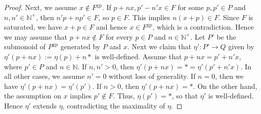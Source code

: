 \documentclass[10pt,a4paper]{amsart}
\newcommand{\N}{\mathbb{N}}
\newcommand{\gp}{\mathrm{gp}}
\begin{document}
\begin{proof}
Next, we assume $x\notin F^\gp$.
If $p+nx,p'-n'x\in F$ for some $p,p'\in P$ and $n,n'\in \N^+$,
then $n'p+np'\in F$,
so $p\in F$.
This implies $n(x+p)\in F$.
Since $F$ is saturated,
we have $x+p\in F$ and hence $x\in F^\gp$,
which is a contradiction.
Hence we may assume that $p+nx\notin F$ for every $p\in P$ and $n\in \N^+$.
Let $P'$ be the submonoid of $P^\gp$ generated by $P$ and $x$.
Next we claim that $\eta'\colon P'\to Q$ given by $\eta'(p+nx):=\eta(p)+n\ast$ is well-defined.
Assume that $p+nx=p'+n'x$, where $p'\in P$ and $n\in \N$.
If $n,n'>0$,
then $\eta'(p+nx)=*=\eta'(p'+n'x)$.
In all other cases, we assume $n'=0$ without loss of generality.
If $n=0$,
then we have $\eta'(p+nx)=\eta'(p')$.
If $n>0$,
then $\eta'(p+nx)=*$.
On the other hand,
the assumption on $x$ implies $p'\notin F$.
Thus, $\eta(p')=*$, so that $\eta'$ is well-defined.
Hence $\eta'$ extends $\eta$,
contradicting the maximality of $\eta$.
\end{proof}
\end{document}
